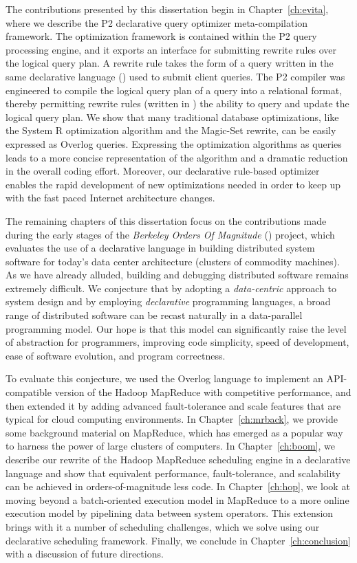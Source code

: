 The contributions presented by this dissertation begin in Chapter~\ref{ch:evita}, where we describe the P2 declarative 
query optimizer meta-compilation framework. The optimization framework is contained within the P2 query processing engine, 
and it exports an interface for submitting rewrite rules over the logical query plan. A rewrite rule takes the form of a query written 
in the same declarative language (\OVERLOG) used to submit 
client queries. The P2 compiler was engineered to compile the logical query plan of a query into a relational format, thereby permitting 
rewrite rules (written in \OVERLOG) the ability to query and update the logical query plan.  We show that many traditional database 
optimizations, like the System R optimization algorithm and the Magic-Set rewrite, can be easily expressed as Overlog queries. 
Expressing the optimization algorithms as \OVERLOG queries leads to a more concise representation of the algorithm 
and a dramatic reduction in the overall coding effort. Moreover, our declarative rule-based optimizer enables the rapid 
development of new optimizations needed in order to keep up with the fast paced Internet architecture changes.
 
The remaining chapters of this dissertation focus on the contributions made during the early stages 
of the {\em Berkeley Orders Of Magnitude} (\BOOM) project, which evaluates the use of a declarative 
language in building distributed system software for today's data center architecture (clusters of commodity 
machines). As we have already alluded, building and debugging distributed software remains extremely 
difficult. We conjecture that by adopting a \emph{data-centric} approach to 
system design and by employing \emph{declarative} programming languages, a broad range of distributed software 
can be recast naturally in a data-parallel programming model.  Our hope is that this model can significantly raise the level of abstraction 
for programmers, improving code simplicity, speed of development, ease of software evolution, and program correctness.

To evaluate this conjecture, we used the Overlog language to implement an API-compatible version of the Hadoop 
MapReduce with competitive performance, and then extended it by adding advanced fault-tolerance and scale features 
that are typical for cloud computing environments. In Chapter~\ref{ch:mrback}, we provide some background material on 
MapReduce, which has emerged as a popular way to harness the power of large clusters of computers. In Chapter~\ref{ch:boom}, 
we describe our rewrite of the Hadoop MapReduce scheduling engine in a declarative language and show that equivalent 
performance, fault-tolerance, and scalability can be achieved in orders-of-magnitude less code. In Chapter~\ref{ch:hop}, we 
look at moving beyond a batch-oriented execution model in MapReduce to a more online execution model by pipelining 
data between system operators. This extension brings with it a number of scheduling challenges, which we solve
using our declarative scheduling framework. Finally, we conclude in Chapter~\ref{ch:conclusion} with a discussion 
of future directions.







